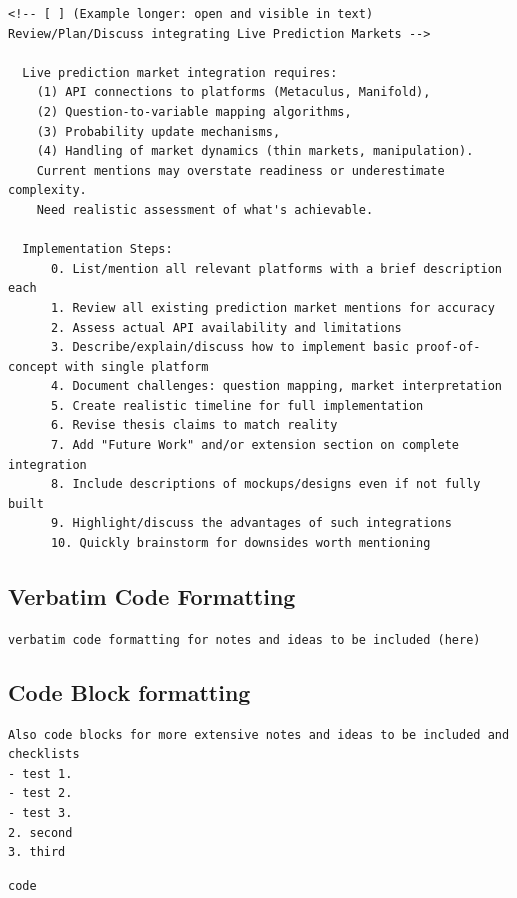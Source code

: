 \documentclass[
  11pt,
  letterpaper,
]{book}
\begin{document}
\begin{verbatim}
<!-- [ ] (Example longer: open and visible in text)    Review/Plan/Discuss integrating Live Prediction Markets -->

  Live prediction market integration requires:
    (1) API connections to platforms (Metaculus, Manifold),
    (2) Question-to-variable mapping algorithms,
    (3) Probability update mechanisms, 
    (4) Handling of market dynamics (thin markets, manipulation).
    Current mentions may overstate readiness or underestimate complexity.
    Need realistic assessment of what's achievable.

  Implementation Steps:
      0. List/mention all relevant platforms with a brief description each
      1. Review all existing prediction market mentions for accuracy
      2. Assess actual API availability and limitations
      3. Describe/explain/discuss how to implement basic proof-of-concept with single platform
      4. Document challenges: question mapping, market interpretation
      5. Create realistic timeline for full implementation
      6. Revise thesis claims to match reality
      7. Add "Future Work" and/or extension section on complete integration
      8. Include descriptions of mockups/designs even if not fully built 
      9. Highlight/discuss the advantages of such integrations
      10. Quickly brainstorm for downsides worth mentioning
\end{verbatim}

\subsection{Verbatim Code Formatting}\label{verbatim-code-formatting-1}

\texttt{verbatim\ code\ formatting\ for\ notes\ and\ ideas\ to\ be\ included\ (here)}

\subsection{Code Block formatting}\label{code-block-formatting-1}

\begin{verbatim}
Also code blocks for more extensive notes and ideas to be included and checklists
- test 1. 
- test 2. 
- test 3.
2. second
3. third
\end{verbatim}

\begin{verbatim}
code
\end{verbatim}
\end{document}
